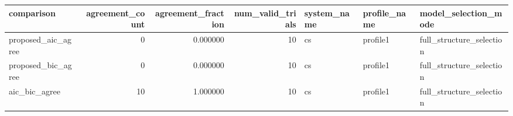\begin{tabular}{lrrrlll}
\toprule
comparison & agreement_count & agreement_fraction & num_valid_trials & system_name & profile_name & model_selection_mode \\
\midrule
proposed_aic_agree & 0 & 0.000000 & 10 & cs & profile1 & full_structure_selection \\
proposed_bic_agree & 0 & 0.000000 & 10 & cs & profile1 & full_structure_selection \\
aic_bic_agree & 10 & 1.000000 & 10 & cs & profile1 & full_structure_selection \\
\bottomrule
\end{tabular}
